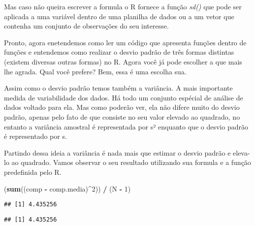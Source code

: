 \documentclass[]{book}
\newenvironment{Shaded}{\begin{snugshade}}{\end{snugshade}}
\newcommand{\DecValTok}[1]{\textcolor[rgb]{0.00,0.00,0.81}{#1}}
\newcommand{\KeywordTok}[1]{\textcolor[rgb]{0.13,0.29,0.53}{\textbf{#1}}}
\newcommand{\NormalTok}[1]{#1}
\newcommand{\OperatorTok}[1]{\textcolor[rgb]{0.81,0.36,0.00}{\textbf{#1}}}
\newcommand{\StringTok}[1]{\textcolor[rgb]{0.31,0.60,0.02}{#1}}
\begin{document}
Mas caso não queira escrever a formula o R fornece a função \emph{sd()} que pode ser aplicada a uma variável dentro de uma planilha de dados ou a um vetor que contenha um conjunto de observações do seu interesse.

Pronto, agora enetendemos como ler um código que apresenta funções dentro de funções e entendemos como realizar o desvio padrão de três formas distintas (existem diversas outras formas) no R. Agora você já pode escolher a que mais lhe agrada. Qual você prefere? Bem, essa é uma escolha sua.

Assim como o desvio padrão temos também a variância. A mais importante medida de variabilidade dos dados. Há todo um conjunto espécial de análise de dados voltado para ela. Mas como poderão ver, ela não difere muito do desvio padrão, apenas pelo fato de que consiste no seu valor elevado ao quadrado, no entanto a variância amostral é representada por s² enquanto que o desvio padrão é representado por s.

Partindo dessa ideia a variância é nada mais que estimar o desvio padrão e eleva-lo ao quadrado. Vamos observar o seu resultado utilizando sua formula e a função predefinida pelo R.

\begin{Shaded}
\begin{Highlighting}[]
\NormalTok{(}\KeywordTok{sum}\NormalTok{((comp }\OperatorTok{-}\StringTok{ }\NormalTok{comp.media)}\OperatorTok{^}\DecValTok{2}\NormalTok{)) }\OperatorTok{/}\StringTok{ }\NormalTok{(N }\OperatorTok{-}\StringTok{ }\DecValTok{1}\NormalTok{)}
\end{Highlighting}
\end{Shaded}

\begin{verbatim}
## [1] 4.435256
\end{verbatim}

\begin{Shaded}
\end{Shaded}

\begin{verbatim}
## [1] 4.435256
\end{verbatim}

\begin{Shaded}
\end{Shaded}
\end{document}

